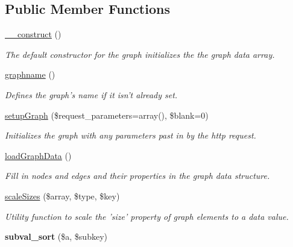 \subsection*{Public Member Functions}
\begin{DoxyCompactItemize}
\item 
\hyperlink{classGraph_abeec16b1020f6d57d82d91ecf13b3ba9}{\_\-\_\-construct} ()
\begin{DoxyCompactList}\small\item\em The default constructor for the graph initializes the the graph data array. \item\end{DoxyCompactList}\item 
\hyperlink{classGraph_ae31fe01b00d373a1d022286a53f150a2}{graphname} ()
\begin{DoxyCompactList}\small\item\em Defines the graph's name if it isn't already set. \item\end{DoxyCompactList}\item 
\hyperlink{classGraph_a709d645a5323981d2b6d09a65121153e}{setupGraph} (\$request\_\-parameters=array(), \$blank=0)
\begin{DoxyCompactList}\small\item\em Initializes the graph with any parameters past in by the http request. \item\end{DoxyCompactList}\item 
\hyperlink{classGraph_ac010f0389fcc16ee975d03af5aaa1dae}{loadGraphData} ()
\begin{DoxyCompactList}\small\item\em Fill in nodes and edges and their properties in the graph data structure. \item\end{DoxyCompactList}\item 
\hyperlink{classGraph_a8217420bb7c218aa141e664a6f3562f5}{scaleSizes} (\$array, \$type, \$key)
\begin{DoxyCompactList}\small\item\em Utility function to scale the 'size' property of graph elements to a data value. \item\end{DoxyCompactList}\item 
\hypertarget{classGraph_ad091d05774840be054c17806c30730d9}{
{\bfseries subval\_\-sort} (\$a, \$subkey)}
\label{classGraph_ad091d05774840be054c17806c30730d9}


\end{DoxyCompactItemize}
